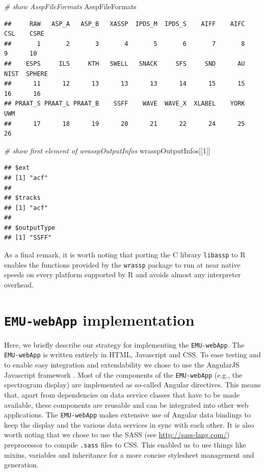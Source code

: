 \documentclass[]{book}
\newenvironment{Shaded}{\begin{snugshade}}{\end{snugshade}}
\newcommand{\CommentTok}[1]{\textcolor[rgb]{0.56,0.35,0.01}{\textit{#1}}}
\newcommand{\DecValTok}[1]{\textcolor[rgb]{0.00,0.00,0.81}{#1}}
\newcommand{\NormalTok}[1]{#1}
\begin{document}
\begin{Shaded}
\begin{Highlighting}[]
\CommentTok{# show AsspFileFormats}
\NormalTok{AsspFileFormats}
\end{Highlighting}
\end{Shaded}

\begin{verbatim}
##     RAW   ASP_A   ASP_B   XASSP  IPDS_M  IPDS_S    AIFF    AIFC     CSL    CSRE 
##       1       2       3       4       5       6       7       8       9      10 
##    ESPS     ILS     KTH   SWELL   SNACK     SFS     SND      AU    NIST  SPHERE 
##      11      12      13      13      13      14      15      15      16      16 
## PRAAT_S PRAAT_L PRAAT_B    SSFF    WAVE  WAVE_X  XLABEL    YORK     UWM 
##      17      18      19      20      21      22      24      25      26
\end{verbatim}

\begin{Shaded}
\begin{Highlighting}[]
\CommentTok{# show first element of wrasspOutputInfos}
\NormalTok{wrasspOutputInfos[[}\DecValTok{1}\NormalTok{]]}
\end{Highlighting}
\end{Shaded}

\begin{verbatim}
## $ext
## [1] "acf"
## 
## $tracks
## [1] "acf"
## 
## $outputType
## [1] "SSFF"
\end{verbatim}

As a final remark, it is worth noting that porting the C library \texttt{libassp} to R enables the functions provided by the \texttt{wrassp} package to run at near native speeds on every platform supported by R and avoids almost any interpreter overhead.

\hypertarget{chap:emu-webAppImplementation}{%
\chapter{\texorpdfstring{\texttt{EMU-webApp} implementation}{EMU-webApp implementation}}\label{chap:emu-webAppImplementation}}

Here, we briefly describe our strategy for implementing the \texttt{EMU-webApp}. The \texttt{EMU-webApp} is written entirely in HTML, Javascript and CSS. To ease testing and to enable easy integration and extendability we chose to use the AngularJS Javascript framework \citep{google:2014a}. Most of the components of the \texttt{EMU-webApp} (e.g., the spectrogram display) are implemented as so-called Angular directives. This means that, apart from dependencies on data service classes that have to be made available, these components are reusable and can be integrated into other web applications. The \texttt{EMU-webApp} makes extensive use of Angular data bindings to keep the display and the various data services in sync with each other. It is also worth noting that we chose to use the SASS (see \url{http://sass-lang.com/}) preprocessor to compile \texttt{.sass} files to CSS. This enabled us to use things like mixins, variables and inheritance for a more concise stylesheet management and generation.
\end{document}
